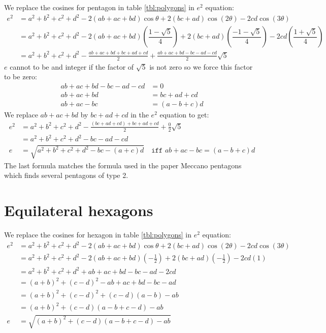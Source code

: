\documentclass[11pt]{article}
\begin{document}
We replace the cosines for pentagon in table \ref{tbl:polygons} in $e^2$ equation:
\begin{align}
e^2 &= a^2 +b^2 +c^2 +d^2 -2(ab+ac+bd)\cos\theta +2(bc+ad)\cos(2\theta) -2cd\cos(3\theta) \nonumber\\
 &= a^2 +b^2 +c^2 +d^2
  -2(ab+ac+bd)\left(\dfrac{1-\sqrt{5}}{4}\right)
  +2(bc+ad)\left(\dfrac{-1-\sqrt{5}}{4}\right)
  -2cd\left(\dfrac{1+\sqrt{5}}{4}\right) \nonumber\\
 &= a^2 +b^2 +c^2 +d^2 -\frac{ab+ac+bd+bc+ad+cd}{2} +\frac{ab+ac+bd-bc-ad-cd}{2}\sqrt{5}
\end{align}
$e$ cannot to be and integer if the factor of $\sqrt{5}$ is not zero so we force this factor to be zero:
\begin{align}
 ab+ac+bd-bc-ad-cd &= 0\nonumber\\
 ab+ac+bd &= bc+ad+cd \\
 ab+ac-bc &= (a-b+c)d
\end{align}
We replace $ab+ac+bd$ by $bc+ad+cd$ in the $e^2$ equation to get:
\begin{align}
e^2 &= a^2 +b^2 +c^2 +d^2 -\frac{(bc+ad+cd)+bc+ad+cd}{2} +\frac{0}{2}\sqrt{5} \nonumber\\
 &= a^2 +b^2 +c^2 +d^2 -bc -ad -cd \nonumber\\
e &= \sqrt{a^2 +b^2 +c^2 +d^2 -bc -(a+c)d } \quad\texttt{iff } ab+ac-bc = (a-b+c)d
\end{align}
The last formula matches the formula used in the paper Meccano pentagons which finds several pentagons of type 2. 


\section{Equilateral hexagons}

We replace the cosines for hexagon in table \ref{tbl:polygons} in $e^2$ equation:
\begin{align}
e^2 &= a^2 +b^2 +c^2 +d^2 -2(ab+ac+bd)\cos\theta +2(bc+ad)\cos(2\theta) -2cd\cos(3\theta) \nonumber\\
 &= a^2 +b^2 +c^2 +d^2 -2(ab+ac+bd)\left(-\frac{1}{2}\right) +2(bc+ad)\left(-\frac{1}{2}\right) -2cd(1) \nonumber\\
 &= a^2 +b^2 +c^2 +d^2 +ab+ac+bd -bc-ad-2cd \nonumber\\
 &= (a+b)^2 +(c-d)^2 -ab+ac+bd-bc-ad\nonumber\\
 &= (a+b)^2 +(c-d)^2 +(c-d)(a-b) -ab \nonumber\\
 &= (a+b)^2 +(c-d)(a-b+c-d) -ab \nonumber\\
e &= \sqrt{(a+b)^2 +(c-d)(a-b+c-d) -ab}
\end{align} 
\end{document}
